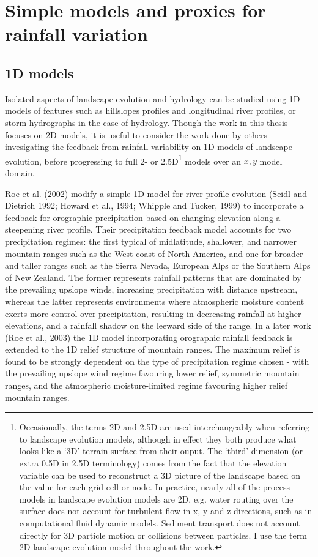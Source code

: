 \section{Simple models and proxies for rainfall variation}

\subsection{1D models}
Isolated aspects of landscape evolution and hydrology can be studied using 1D models of features such as hillslopes profiles and longitudinal river profiles, or storm hydrographs in the case of hydrology. Though the work in this thesis focuses on 2D models, it is useful to consider the work done by others invesigating the feedback from rainfall variability on 1D models of landscape evolution, before progressing to full 2- or 2.5D\footnote{Occasionally, the terms 2D and 2.5D are used interchangeably when referring to landscape evolution models, although in effect they both produce what looks like a `3D' terrain surface from their ouput. The `third' dimension (or extra 0.5D in 2.5D terminology) comes from the fact that the elevation variable can be used to reconstruct a 3D picture of the landscape based on the value for each grid cell or node. In practice, nearly all of the process models in landscape evolution models are 2D, e.g. water routing over the surface does not account for turbulent flow in x, y and z directions, such as in computational fluid dynamic models. Sediment transport does not account directly for 3D particle motion or collisions between particles. I use the term 2D landscape evolution model throughout the work.} models over an \(x,y\) model domain. 

Roe et al. (2002) modify a simple 1D model for river profile evolution (Seidl and Dietrich 1992; Howard et al., 1994; Whipple and Tucker, 1999) to incorporate a feedback for orographic precipitation based on changing elevation along a steepening river profile. Their precipitation feedback model accounts for two precipitation regimes: the first typical of midlatitude, shallower, and narrower mountain ranges such as the West coast of North America, and one for broader and taller ranges such as the Sierra Nevada, European Alps or the Southern Alps of New Zealand. The former represents rainfall patterns that are dominated by the prevailing upslope winds, increasing precipitation with distance upstream, whereas the latter represents environments where atmospheric moisture content exerts more control over precipitation, resulting in decreasing rainfall at higher elevations, and a rainfall shadow on the leeward side of the range. In a later work (Roe et al., 2003) the 1D model incorporating orographic rainfall feedback is extended to the 1D relief structure of mountain ranges. The maximum relief is found to be strongly dependent on the type of precipitation regime chosen - with the prevailing upslope wind regime favouring lower relief, symmetric mountain ranges, and the atmospheric moisture-limited regime favouring higher relief mountain ranges.

